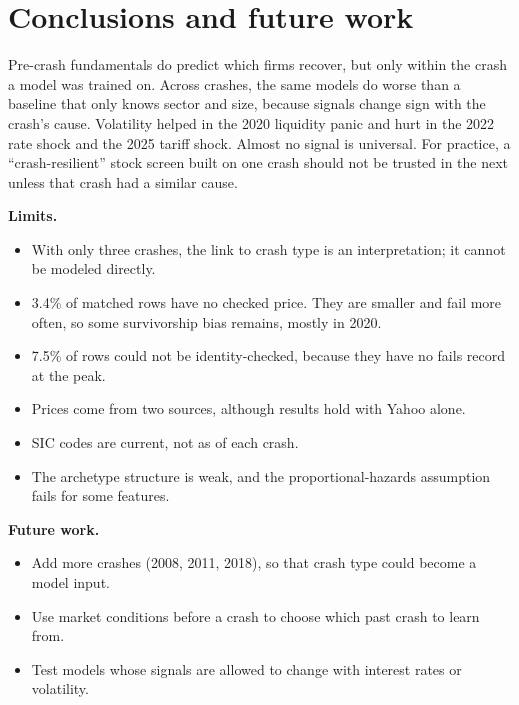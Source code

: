 \documentclass[11pt]{article}
\begin{document}
\section{Conclusions and future work}

Pre-crash fundamentals do predict which firms recover, but only within the crash a model was trained on. Across crashes, the same models do worse than a baseline that only knows sector and size, because signals change sign with the crash's cause. Volatility helped in the 2020 liquidity panic and hurt in the 2022 rate shock and the 2025 tariff shock. Almost no signal is universal. For practice, a ``crash-resilient'' stock screen built on one crash should not be trusted in the next unless that crash had a similar cause.

\textbf{Limits.}
\begin{itemize}
  \item With only three crashes, the link to crash type is an interpretation; it cannot be modeled directly.
  \item 3.4\% of matched rows have no checked price. They are smaller and fail more often, so some survivorship bias remains, mostly in 2020.
  \item 7.5\% of rows could not be identity-checked, because they have no fails record at the peak.
  \item Prices come from two sources, although results hold with Yahoo alone.
  \item SIC codes are current, not as of each crash.
  \item The archetype structure is weak, and the proportional-hazards assumption fails for some features.
\end{itemize}

\textbf{Future work.}
\begin{itemize}
  \item Add more crashes (2008, 2011, 2018), so that crash type could become a model input.
  \item Use market conditions before a crash to choose which past crash to learn from.
  \item Test models whose signals are allowed to change with interest rates or volatility.
\end{itemize}
\end{document}
